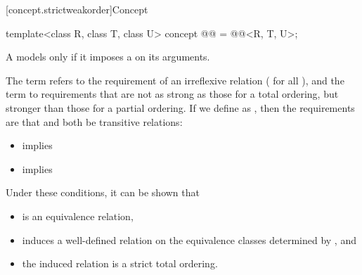 [concept.strictweakorder]{Concept }

\begin{itemdecl}
template<class R, class T, class U>
  concept @@ = @@<R, T, U>;
\end{itemdecl}

\begin{itemdescr}
\pnum
A  models  only if
it imposes a  on its arguments.

\pnum
The term
refers to the
requirement of an irreflexive relation ( for all ),
and the term
to requirements that are not as strong as
those for a total ordering,
but stronger than those for a partial
ordering.
If we define
as
,
then the requirements are that
and
both be transitive relations:

\begin{itemize}
\item
{}
implies
\item
{}
implies
\end{itemize}

\pnum
\begin{note}
Under these conditions, it can be shown that
\begin{itemize}
\item
{}
is an equivalence relation,
\item
{}
induces a well-defined relation on the equivalence
classes determined by
, and
\item
the induced relation is a strict total ordering.
\end{itemize}
\end{note}
\end{itemdescr}
